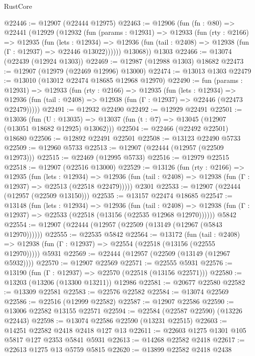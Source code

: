 \begin{lexlean}{RustCore}
\begin{coremodule}
@22446 := @12907 (@22444 @12975)
@22463 := @12906
    (fun (fn : @80) =>
    @22441
      (@12929
        (@12932
          (fun (params : @12931) =>
          @12933
            (fun (rty : @2166) =>
            @12935
              (fun (lets : @12934) =>
              @12936 (fun (tail : @2408) => @12938 (fun (Γ : @12937) => @22446 @13022))))))
        @13068))
    @1303
@22466 := @13074 (@22439 (@12924 @1303))
@22469 := @12987 (@12988 @1303) @18682
@22473 := @12907 (@12979 (@22469 @12996) @13000)
@22474 := @13013 @1303
@22479 := @13010 (@13012 @22474 @18685 @12968 @12970)
@22490 := fun (params : @12931) =>
  @12933
    (fun (rty : @2166) =>
    @12935
      (fun (lets : @12934) =>
      @12936 (fun (tail : @2408) => @12938 (fun (Γ : @12937) => @22446 (@22473 @22479)))))
@22491 := @12932 @22490
@22492 := @12929 @22491
@22501 := @13036
    (fun (U : @13035) => @13037 (fun (t : @7) => @13045 (@12907 (@13051 @18682 @12925) @13062)))
@22504 := @22466 (@22492 @22501) @18680
@22506 := @12892 @22491 @22501
@22508 := @13123 @22490 @5733
@22509 := @12960 @5733
@22513 := @12907 (@22444 (@12957 (@22509 @12973)))
@22515 := @22469 (@12995 @5733)
@22516 := @12979 @22515
@22518 := @12907 (@22516 @13000)
@22529 := @13126
    (fun (rty : @2166) =>
    @12935
      (fun (lets : @12934) =>
      @12936 (fun (tail : @2408) => @12938 (fun (Γ : @12937) => @22513 (@22518 @22479)))))
    @2301
@22533 := @12907 (@22444 (@12957 (@22509 @13150)))
@22535 := @13157 @22474 @18685
@22547 := @13148
    (fun (lets : @12934) =>
    @12936
      (fun (tail : @2408) =>
      @12938 (fun (Γ : @12937) => @22533 (@22518 (@13156 (@22535 @12968 @12970))))))
    @5842
@22554 := @12907 (@22444 (@12957 (@22509 (@13149 (@12967 (@5843 @12970))))))
@22555 := @22535 @5842
@22564 := @13172
    (fun (tail : @2408) => @12938 (fun (Γ : @12937) => @22554 (@22518 (@13156 (@22555 @12970)))))
    @5931
@22569 := @22444 (@12957 (@22509 (@13149 (@12967 @5932))))
@22570 := @12907 @22569
@22571 := @22555 @5931
@22576 := @13190 (fun (Γ : @12937) => @22570 (@22518 (@13156 @22571)))
@22580 := @13203 (@13206 (@13300 @13211)) @12986
@22581 := @20677 @22580
@22582 := @13309 @22581
@22583 := @22576 @22582
@22584 := @13074 @22569
@22586 := @22516 (@12999 @22582)
@22587 := @12907 @22586
@22590 := @13006 @22582 @13155 @22571
@22594 := @22584 (@22587 @22590) (@13226 @22443)
@22598 := @13074 @22586 @22590 (@13231 @22515)
@22603 := @14251 @22582 @2418 @2418 @127 @13
@22611 := @22603 @1275 @1301 @105 @5817 @127 @2353 @5841 @5931
@22613 := @14268 @22582 @2418
@22617 := @22613 @1275 @13 @5759 @5815
@22620 := @13899 @22582 @2418 @2438

\end{coremodule}
\end{lexlean}
